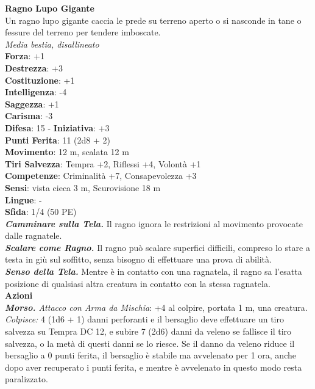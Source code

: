 \begin{multicols}{2}
\medskip\textbf{Ragno Lupo Gigante}\\
Un ragno lupo gigante caccia le prede su terreno aperto o si nasconde in tane o fessure del terreno per tendere imboscate.\\
\emph{Media bestia, disallineato}\\
\textbf{Forza}: +1\\
\textbf{Destrezza}: +3\\
\textbf{Costituzione}: +1\\
\textbf{Intelligenza}: -4\\
\textbf{Saggezza}: +1\\
\textbf{Carisma}: -3\\
\textbf{Difesa}: 15 - \textbf{Iniziativa}: +3\\
\textbf{Punti Ferita}: 11 (2d8 + 2)\\
\textbf{Movimento}: 12 m, scalata 12 m\\
\textbf{Tiri Salvezza}:  Tempra +2, Riflessi +4, Volontà +1 \\
\textbf{Competenze}: Criminalità +7, Consapevolezza +3\\
\textbf{Sensi}: vista cieca 3 m, Scurovisione 18 m\\
\textbf{Lingue}: -\\
\textbf{Sfida}: 1/4 (50 PE)\smallskip\\
\emph{\textbf{Camminare sulla Tela.}} Il ragno ignora le restrizioni al movimento provocate dalle ragnatele.\\
\emph{\textbf{Scalare come Ragno.}} Il ragno può scalare superfici difficili, compreso lo stare a testa in giù sul soffitto, senza bisogno di effettuare una prova di abilità.\\
\emph{\textbf{Senso della Tela.}} Mentre è in contatto con una ragnatela, il ragno sa l'esatta posizione di qualsiasi altra creatura in contatto con la stessa ragnatela.\\
\smallskip\textbf{Azioni}\\
\emph{\textbf{Morso.} Attacco con Arma da Mischia}: +4 al colpire, portata 1 m, una creatura.\\
\emph{Colpisce:} 4 (1d6 + 1) danni perforanti e il bersaglio deve effettuare un tiro salvezza su Tempra DC  12, e subire 7 (2d6) danni da veleno se fallisce il tiro salvezza, o la metà di questi danni se lo riesce. Se il danno da veleno riduce il bersaglio a 0 punti ferita, il bersaglio è stabile ma avvelenato per 1 ora, anche dopo aver recuperato i punti ferita, e mentre è avvelenato in questo modo resta paralizzato.\\


\end{multicols}
